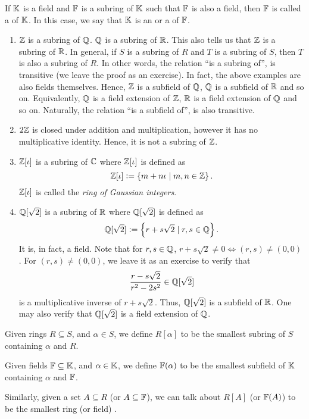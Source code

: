 \begin{defn}[Subfield]
    If $\mathbb{K}$ is a field and $\mathbb{F}$ is a subring of $\mathbb{K}$ such that $\mathbb{F}$ is also a field, then $\mathbb{F}$ is called a  of $\mathbb{K}$. In this case, we say that $\mathbb{K}$ is an  or a  of $\mathbb{F}$.
\end{defn}

\begin{ex}
\phantom{hi}
\begin{enumerate}
    \item $\mathbb{Z}$ is a subring of $\mathbb{Q}$. $\mathbb{Q}$ is a subring of $\mathbb{R}$. This also tells us that $\mathbb{Z}$ is a subring of $\mathbb{R}$. In general, if $S$ is a subring of $R$ and $T$ is a subring of $S$, then $T$ is also a subring of $R$. In other words, the relation ``is a subring of'', is transitive (we leave the proof as an exercise). In fact, the above examples are also fields themselves. Hence, $\mathbb{Z}$ is a subfield of $\mathbb{Q}$, $\mathbb{Q}$ is a subfield of $\mathbb{R}$ and so on. Equivalently, $\mathbb{Q}$ is a field extension of $\mathbb{Z}$, $\mathbb{R}$ is a field extension of $\mathbb{Q}$ and so on. Naturally, the relation ``is a subfield of'', is also transitive.
    
    \item $2\mathbb{Z}$ is closed under addition and multiplication, however it has no multiplicative identity. Hence, it is not a subring of $\mathbb{Z}$.
    \item $\mathbb{Z}[\iota]$ is a subring of $\mathbb{C}$ where $\mathbb{Z}[\iota]$ is defined as
    \[
        \mathbb{Z}[\iota] \vcentcolon= \left\{ m + n\iota \mid m,n \in \mathbb{Z} \right\}.
    \]
    $\mathbb{Z}[\iota]$ is called the \emph{ring of Gaussian integers}.
    \item $\mathbb{Q}[\sqrt{2}]$ is a subring of $\mathbb{R}$ where $\mathbb{Q}[\sqrt{2}]$ is defined as
    \[
        \mathbb{Q}[\sqrt{2}] \vcentcolon= \left\{ r + s\sqrt{2} \mid r,s \in \mathbb{Q} \right\}.
    \]
    It is, in fact, a field. Note that for $r,s \in \mathbb{Q}$, $r+s\sqrt{2} \neq 0 \iff (r,s) \neq (0,0)$ . For $(r,s) \neq (0,0)$, we leave it as an exercise to verify that
    \[
        \frac{r-s\sqrt{2}}{r^2 - 2s^2} \in \mathbb{Q}[\sqrt{2}]
    \]
    is a multiplicative inverse of $r+s\sqrt{2}$. Thus, $\mathbb{Q}[\sqrt{2}]$ is a subfield of $\mathbb{R}$. One may also verify that $\mathbb{Q}[\sqrt{2}]$ is a field extension of $\mathbb{Q}$.
\end{enumerate}
\end{ex}

\begin{defn}
   Given rings $R \subseteq S$, and $\alpha \in S$, we define $R[\alpha]$ to be the smallest subring of $S$ containing $\alpha$ and $R$.
   
   Given fields $\mathbb{F} \subseteq \mathbb{K}$, and $\alpha \in \mathbb{K}$, we define $\mathbb{F}(\alpha)$ to be the smallest subfield of $\mathbb{K}$ containing $\alpha$ and $\mathbb{F}$.
   
   Similarly, given a set $A \subseteq R$ (or $A \subseteq \mathbb{F}$), we can talk about $R[A]$ (or $\mathbb{F}(A)$) to be the smallest ring (or field) .
\end{defn}

